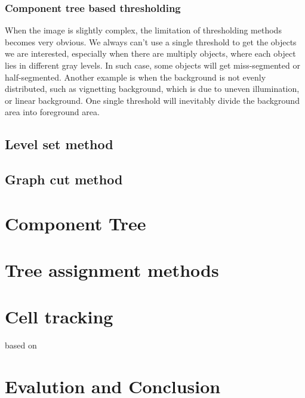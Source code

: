 \documentclass[b5,12pt]{report}
\begin{document}
\subsection{Component tree based thresholding}
When the image is slightly complex, the limitation of thresholding methods becomes very obvious. We always can't use a single threshold to get the objects we are interested, especially when there are multiply objects, where each object lies in different gray levels. In such case, some objects will get miss-segmented or half-segmented. Another example is when the background is not evenly distributed, such as vignetting background, which is due to uneven illumination, or linear background. One single threshold will inevitably divide the background area into foreground area.
\section{Level set method}
\section{Graph cut method}
\chapter{Component Tree}
\chapter{Tree assignment methods}
\chapter{Cell tracking}
based on \cite{Xiao:2011}
\chapter{Evalution and Conclusion}


\end{document}
